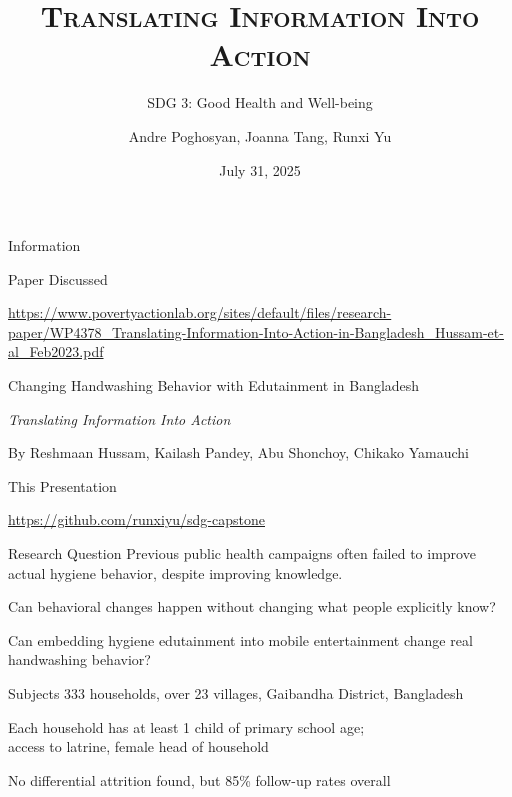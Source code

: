 \documentclass[aspectratio=169]{beamer}
\title{\scshape Translating Information Into Action}
\subtitle{\upshape SDG 3: Good Health and Well-being}
\author{Andre Poghosyan, Joanna Tang, Runxi Yu}
\date{July 31, 2025}
\begin{document}
\maketitle

\begin{frame}{Information}
	\begin{block}{Paper Discussed}
		\setlength{\parskip}{0.8ex}

		\url{https://www.povertyactionlab.org/sites/default/files/research-paper/WP4378_Translating-Information-Into-Action-in-Bangladesh_Hussam-et-al_Feb2023.pdf}

		Changing Handwashing Behavior with Edutainment in Bangladesh

		\textit{Translating Information Into Action}

		By Reshmaan Hussam, Kailash Pandey, Abu Shonchoy, Chikako Yamauchi
	\end{block}
	\begin{block}{This Presentation}
		\setlength{\parskip}{0.8ex}

		\url{https://github.com/runxiyu/sdg-capstone}
	\end{block}
\end{frame}

\begin{frame}{Research Question}
	Previous public health campaigns often failed to improve actual hygiene
	behavior, despite improving knowledge.

	Can behavioral changes happen without changing what people explicitly
	know?

	\Large Can embedding hygiene edutainment into mobile entertainment
	change real handwashing behavior?

\end{frame}

\begin{frame}{Subjects}
	333 households, over 23 villages, Gaibandha District, Bangladesh

	Each household has at least 1 child of primary school age;\\
	access to latrine, female head of household

	\bigskip

	No differential attrition found, but 85\% follow-up rates overall
\end{frame}
\end{document}
